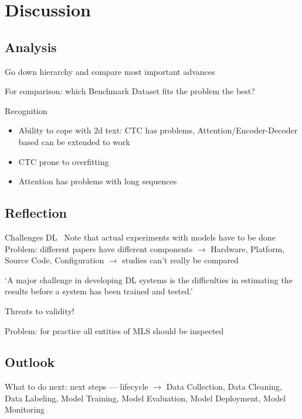 \chapter{Discussion}\label{ch:discussion}
\section{Analysis}
Go down hierarchy and compare most important advances

For comparison: which Benchmark Dataset fits the problem the best?

Recognition
\begin{itemize}
    \item Ability to cope with 2d text:
        CTC has problems,
        Attention/Encoder-Decoder based can be extended to work
    \item CTC prone to overfitting
    \item Attention has problems with long sequences
\end{itemize}


\section{Reflection}
Challenges DL~\citep{arpteg_software_2018}
Note that actual experiments with models have to be done
Problem: different papers have different components
$\rightarrow$ Hardware, Platform, Source Code, Configuration
$\rightarrow$ studies can't really be compared

`A major challenge in developing DL systems is the difficulties in estimating
the results before a system has been trained and tested.'~\citep{arpteg_software_2018}

Threats to validity!

Problem: for practice all entities of \ac{MLS} should be inspected

\section{Outlook}

What to do next: next steps --- lifecycle
$\rightarrow$
Data Collection, Data Cleaning, Data Labeling, Model Training, Model Evaluation, Model Deployment,
Model Monitoring~\cite{watanabe_preliminary_2019}
